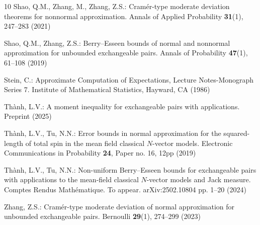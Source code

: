 \begin{thebibliography}{10}
	Shao, Q.M., Zhang, M., Zhang, Z.S.: {Cram{\'{e}}r-type moderate deviation
		theorems for nonnormal approximation}.
	\newblock Annals of Applied Probability \textbf{31}(1), 247--283 (2021)
	
	Shao, Q.M., Zhang, Z.S.: {Berry--Esseen bounds of normal and nonnormal
		approximation for unbounded exchangeable pairs}.
	\newblock Annals of Probability \textbf{47}(1), 61--108 (2019)
	
	Stein, C.: Approximate Computation of Expectations, Lecture Notes-Monograph
	Series 7.
	\newblock Institute of Mathematical Statistics, Hayward, CA (1986)
	
	Th\`{a}nh, L.V.: A moment inequality for exchangeable pairs with applications.
	\newblock Preprint  (2025)
	
	Th\`{a}nh, L.V., Tu, N.N.: {Error bounds in normal approximation for the
		squared-length of total spin in the mean field classical $N$-vector models}.
	\newblock Electronic Communications in Probability \textbf{24}, Paper no. 16,
	12pp (2019)
	
	Th\`{a}nh, L.V., Tu, N.N.: {Non-uniform Berry--Esseen bounds for exchangeable
		pairs with applications to the mean-field classical $N$-vector models and
		Jack measure}.
	\newblock Comptes Rendus Math\'{e}matique. To appear. arXiv:2502.10804 pp.
	1--20 (2024)
	
	Zhang, Z.S.: {Cram\'{e}r-type moderate deviation of normal approximation for
		unbounded exchangeable pairs}.
	\newblock Bernoulli \textbf{29}(1), 274--299 (2023)
	
\end{thebibliography}



